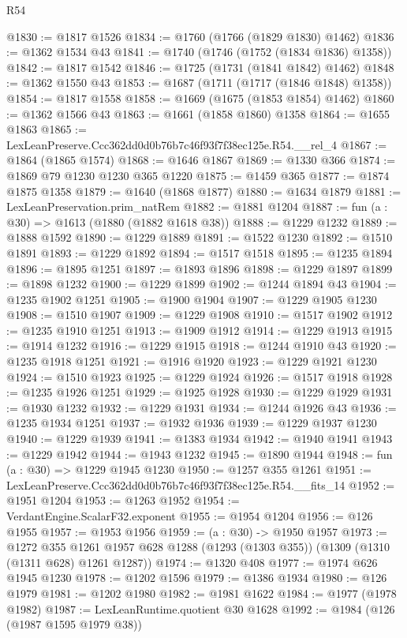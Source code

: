 \begin{lexlean}{R54}
\begin{coremodule}
@1830 := @1817 @1526
@1834 := @1760 (@1766 (@1829 @1830) @1462)
@1836 := @1362 @1534 @43
@1841 := @1740 (@1746 (@1752 (@1834 @1836) @1358))
@1842 := @1817 @1542
@1846 := @1725 (@1731 (@1841 @1842) @1462)
@1848 := @1362 @1550 @43
@1853 := @1687 (@1711 (@1717 (@1846 @1848) @1358))
@1854 := @1817 @1558
@1858 := @1669 (@1675 (@1853 @1854) @1462)
@1860 := @1362 @1566 @43
@1863 := @1661 (@1858 @1860) @1358
@1864 := @1655 @1863
@1865 := LexLeanPreserve.Ccc362dd0d0b76b7c46f93f7f38ec125e.R54.__rel_4
@1867 := @1864 (@1865 @1574)
@1868 := @1646 @1867
@1869 := @1330 @366
@1874 := @1869 @79 @1230 @1230 @365 @1220
@1875 := @1459 @365
@1877 := @1874 @1875 @1358
@1879 := @1640 (@1868 @1877)
@1880 := @1634 @1879
@1881 := LexLeanPreservation.prim_natRem
@1882 := @1881 @1204
@1887 := fun (a : @30) => @1613 (@1880 (@1882 @1618 @38))
@1888 := @1229 @1232
@1889 := @1888 @1592
@1890 := @1229 @1889
@1891 := @1522 @1230
@1892 := @1510 @1891
@1893 := @1229 @1892
@1894 := @1517 @1518
@1895 := @1235 @1894
@1896 := @1895 @1251
@1897 := @1893 @1896
@1898 := @1229 @1897
@1899 := @1898 @1232
@1900 := @1229 @1899
@1902 := @1244 @1894 @43
@1904 := @1235 @1902 @1251
@1905 := @1900 @1904
@1907 := @1229 @1905 @1230
@1908 := @1510 @1907
@1909 := @1229 @1908
@1910 := @1517 @1902
@1912 := @1235 @1910 @1251
@1913 := @1909 @1912
@1914 := @1229 @1913
@1915 := @1914 @1232
@1916 := @1229 @1915
@1918 := @1244 @1910 @43
@1920 := @1235 @1918 @1251
@1921 := @1916 @1920
@1923 := @1229 @1921 @1230
@1924 := @1510 @1923
@1925 := @1229 @1924
@1926 := @1517 @1918
@1928 := @1235 @1926 @1251
@1929 := @1925 @1928
@1930 := @1229 @1929
@1931 := @1930 @1232
@1932 := @1229 @1931
@1934 := @1244 @1926 @43
@1936 := @1235 @1934 @1251
@1937 := @1932 @1936
@1939 := @1229 @1937 @1230
@1940 := @1229 @1939
@1941 := @1383 @1934
@1942 := @1940 @1941
@1943 := @1229 @1942
@1944 := @1943 @1232
@1945 := @1890 @1944
@1948 := fun (a : @30) => @1229 @1945 @1230
@1950 := @1257 @355 @1261
@1951 := LexLeanPreserve.Ccc362dd0d0b76b7c46f93f7f38ec125e.R54.__fits_14
@1952 := @1951 @1204
@1953 := @1263 @1952
@1954 := VerdantEngine.ScalarF32.exponent
@1955 := @1954 @1204
@1956 := @126 @1955
@1957 := @1953 @1956
@1959 := (a : @30) -> @1950 @1957
@1973 := @1272
    @355
    @1261
    @1957
    @628
    @1288
    (@1293 (@1303 @355))
    (@1309 (@1310 (@1311 @628) @1261 @1287))
@1974 := @1320 @408
@1977 := @1974 @626 @1945 @1230
@1978 := @1202 @1596
@1979 := @1386 @1934
@1980 := @126 @1979
@1981 := @1202 @1980
@1982 := @1981 @1622
@1984 := @1977 (@1978 @1982)
@1987 := LexLeanRuntime.quotient @30 @1628
@1992 := @1984 (@126 (@1987 @1595 @1979 @38))

\end{coremodule}
\end{lexlean}
